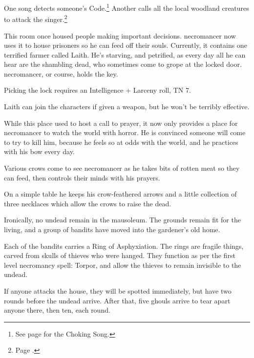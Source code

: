 \begin{multicols}{2}
One song detects someone's Code.\footnote{See page \pageref{chokingsong} for the Choking Song.}
Another calls all the local woodland creatures to attack the singer.\footnote{Page \pageref{medalofheroism}.}


This room once housed people making important decisions.  \Gls{necromancer} now uses it to house prisoners so he can feed off their souls.
Currently, it contains one terrified farmer called Laith.
He's starving, and petrified, as every day all he can hear are the shambling dead, who sometimes come to grope at the locked door.
\Gls{necromancer}, or course, holds the key.

Picking the lock requires an Intelligence + Larceny roll, TN 7.

Laith can join the characters if given a weapon, but he won't be terribly effective.



While this place used to host a call to prayer, it now only provides a place for \gls{necromancer} to watch the world with horror.  He is convinced someone will come to try to kill him, because he feels so at odds with the world, and he practices with his bow every day.

Various crows come to see \gls{necromancer} as he takes bits of rotten meat so they can feed, then controls their minds with his prayers.

On a simple table he keeps his crow-feathered arrows and a little collection of three necklaces which allow the crows to raise the dead.


\thenecromancer


Ironically, no undead remain in the mausoleum.  The grounds remain fit for the living, and a group of bandits have moved into the gardener's old home.

Each of the bandits carries a Ring of Asphyxiation.
The rings are fragile things, carved from skulls of thieves who were hanged.
They function as per the first level necromancy spell: Torpor, and allow the thieves to remain invisible to the undead.

If anyone attacks the house, they will be spotted immediately, but have two rounds before the undead arrive.
After that, five ghouls arrive to tear apart anyone there, then ten, each round.


\end{multicols}
